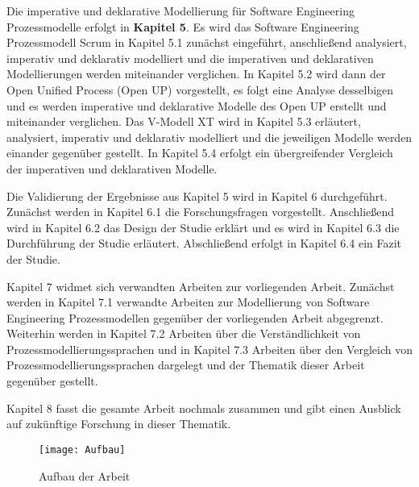 Die imperative und deklarative Modellierung für Software Engineering Prozessmodelle erfolgt in \textbf{Kapitel 5}. Es wird das Software Engineering Prozessmodell Scrum in Kapitel 5.1 zunächst eingeführt, anschließend analysiert, imperativ und deklarativ modelliert und die imperativen und deklarativen Modellierungen werden miteinander verglichen. In Kapitel 5.2 wird dann der Open Unified Process (Open UP) vorgestellt, es folgt eine Analyse desselbigen und es werden imperative und deklarative Modelle des Open UP erstellt und miteinander verglichen. Das V-Modell XT wird in Kapitel 5.3 erläutert, analysiert, imperativ und deklarativ modelliert und die jeweiligen Modelle werden einander gegenüber gestellt. In Kapitel 5.4 erfolgt ein übergreifender Vergleich der imperativen und deklarativen Modelle.\newline

Die Validierung der Ergebnisse aus Kapitel 5 wird in Kapitel 6 durchgeführt. Zunächst werden in Kapitel 6.1 die Forschungsfragen vorgestellt. Anschließend wird in Kapitel 6.2 das Design der Studie erklärt und es wird in Kapitel 6.3 die Durchführung der Studie erläutert. Abschließend erfolgt in Kapitel 6.4 ein Fazit der Studie.  \newline

Kapitel 7 widmet sich verwandten Arbeiten zur vorliegenden Arbeit. Zunächst werden in Kapitel 7.1 verwandte Arbeiten zur Modellierung von Software Engineering Prozessmodellen gegenüber der vorliegenden Arbeit abgegrenzt. Weiterhin werden in Kapitel 7.2 Arbeiten über die Verständlichkeit von Prozessmodellierungssprachen und in Kapitel 7.3 Arbeiten über den Vergleich von Prozessmodellierungssprachen dargelegt und der Thematik dieser Arbeit gegenüber gestellt.\newline

Kapitel 8 fasst die gesamte Arbeit nochmals zusammen und gibt einen Ausblick auf zukünftige Forschung in dieser Thematik.

\begin{figure}[htp]
\begin{center}
  \texttt{[image: Aufbau]} %
  \caption{Aufbau der Arbeit}
  \label{fig:Aufbau}
\end{center}
\end{figure}

